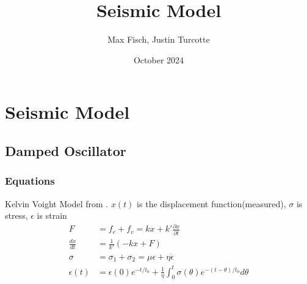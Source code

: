 \documentclass{article}
\title{Seismic Model}
\author{Max Fisch, Justin Turcotte}
\date{October 2024}
\begin{document}
\maketitle
\tableofcontents
\newpage
\section{Seismic Model}
\subsection{Damped Oscillator}
\subsubsection{Equations}
Kelvin Voight Model from \cite{seismic}.
$x(t)$ is the displacement function(measured), $\sigma$ is stress, $\epsilon$ is strain
\begin{align}
  F &= f_e + f_v = kx + k'\frac{\partial x}{\partial t}\\
  \frac{dx}{dt} &= \frac{1}{k'}\left(-kx + F\right)\\
  \sigma &= \sigma_1 + \sigma_2 = \mu\epsilon + \eta\dot{\epsilon}\\
  \epsilon(t) &= \epsilon(0)e^{-t/t_0} + \frac{1}{\eta}\int_0^t\sigma(\theta)e^{-\left(t-\theta\right)/t_0}d\theta
\end{align}

\newpage
\printbibliography
\end{document}
